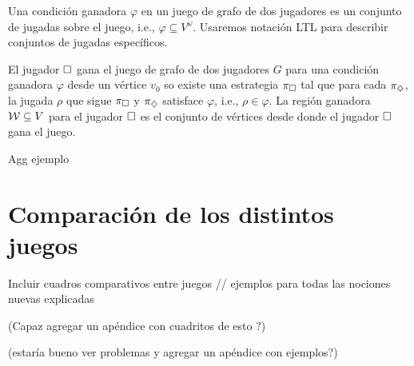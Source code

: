 \begin{definition}
	Una condición ganadora $\varphi$ en un juego de grafo de dos jugadores es un conjunto de jugadas sobre el juego, i.e., $\varphi \subseteq V^\omega$. Usaremos notación LTL para describir conjuntos de jugadas específicos.
\end{definition}

\begin{definition}
	El jugador $\square$ gana el juego de grafo de dos jugadores $G$ para una condición ganadora $\varphi$ desde un vértice $v_0$ so existe una estrategia $\pi_\square$ tal que para cada $\pi_\diamondsuit$, la jugada $\rho$ que sigue $\pi_\square$ y $\pi_\diamondsuit$ satisface $\varphi$, i.e., $\rho \in \varphi$.
	La región ganadora $\mathcal{W} \subseteq V$ para el jugador $\square$ es el conjunto de vértices desde donde el jugador $\square$ gana el juego.
\end{definition}

Agg ejemplo

\section{Comparación de los distintos juegos}

Incluir cuadros comparativos entre juegos // ejemplos para todas las nociones
nuevas explicadas

(Capaz agregar un apéndice con cuadritos de esto ?)

(estaría bueno ver problemas y agregar un apéndice con ejemplos?)